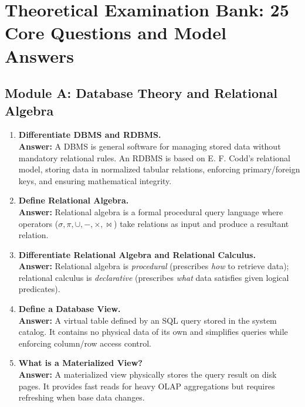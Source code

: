 \section{Theoretical Examination Bank: 25 Core Questions and Model Answers}
\label{sec:dbms_model_answers_25}

\subsection{Module A: Database Theory and Relational Algebra}
\begin{enumerate}[label=\textbf{TA\arabic*.},leftmargin=1.2cm]
\item \textbf{Differentiate DBMS and RDBMS.} \\
\textbf{Answer:} A DBMS is general software for managing stored data without mandatory relational rules. An RDBMS is based on E. F. Codd's relational model, storing data in normalized tabular relations, enforcing primary/foreign keys, and ensuring mathematical integrity.

\item \textbf{Define Relational Algebra.} \\
\textbf{Answer:} Relational algebra is a formal procedural query language where operators ($\sigma, \pi, \cup, -, \times, \bowtie$) take relations as input and produce a resultant relation.

\item \textbf{Differentiate Relational Algebra and Relational Calculus.} \\
\textbf{Answer:} Relational algebra is \textit{procedural} (prescribes \textit{how} to retrieve data); relational calculus is \textit{declarative} (prescribes \textit{what} data satisfies given logical predicates).

\item \textbf{Define a Database View.} \\
\textbf{Answer:} A virtual table defined by an SQL query stored in the system catalog. It contains no physical data of its own and simplifies queries while enforcing column/row access control.

\item \textbf{What is a Materialized View?} \\
\textbf{Answer:} A materialized view physically stores the query result on disk pages. It provides fast reads for heavy OLAP aggregations but requires refreshing when base data changes.


\end{enumerate}
